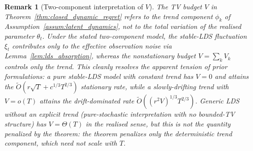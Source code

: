 \documentclass[11pt]{article}
\newtheorem{remark}{Remark}
\begin{document}
\begin{remark}[Two-component interpretation of $V$]
\label{rem:drift_interpretation}
The TV budget $V$ in Theorem~\ref{thm:closed_dynamic_regret} refers to the
\emph{trend} component $\phi_k$ of Assumption~\ref{assum:latent_dynamics},
not to the total variation of the realised parameter $\theta_t$.  Under the
stated two-component model, the stable-LDS fluctuation $\xi_t$ contributes
only to the effective observation noise via Lemma~\ref{lem:lds_absorption},
whereas the nonstationary budget $V=\sum_k V_k$ controls only the trend.
This cleanly resolves the apparent tension of prior formulations: a pure
stable-LDS model with constant trend has $V=0$ and attains the
$\widetilde O(r\sqrt T+c^{1/3}T^{2/3})$ stationary rate, while a slowly-drifting
trend with $V=o(T)$ attains the drift-dominated rate
$\widetilde O((r^2V)^{1/3}T^{2/3})$.  Generic LDS without an explicit trend
(pure-stochastic interpretation with no bounded-TV structure) has
$V=\Theta(T)$ in the realised sense, but this is not the quantity penalized
by the theorem: the theorem penalizes only the deterministic trend
component, which need not scale with $T$.
\end{remark}
\end{document}
